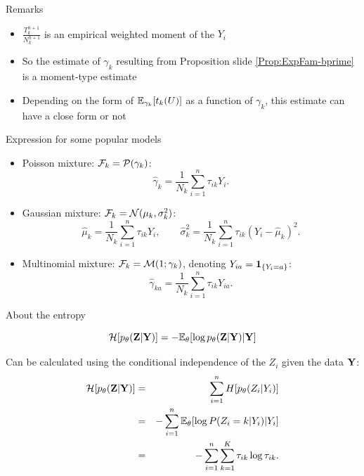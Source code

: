 \documentclass[compress,10pt]{beamer}
\begin{document}
\begin{frame}{Remarks}


\begin{itemize}
 \item $\frac{T^{h+1}_k}{N^{h+1}_k}$ is an empirical weighted moment of the $Y_i$ 
 \item So the estimate of $\gamma_k$ resulting from Proposition slide \ref{Prop:ExpFam-bprime} is a moment-type estimate
 \item Depending on the form of $\mathbb{E}_{\gamma_k}[t_k(U)]$ as a function of $\gamma_k$, this estimate can have a close form or not
 
\end{itemize}
\end{frame}


\begin{frame}{Expression for some popular models}
\begin{itemize}
 \item \textcolor{dgreen}{Poisson mixture}: $\mathcal{F}_k = \mathcal{P}(\gamma_k)$:
  $$
  \widehat{\gamma}_k = \frac{1}{N_k} \sum_{i=1}^n \tau_{ik} Y_i. 
  $$
 \item \textcolor{dgreen}{Gaussian mixture}: $\mathcal{F}_k = \mathcal{N}(\mu_k, \sigma^2_k)$:
  $$
  \widehat{\mu}_k = \frac{1}{N_k} \sum_{i=1}^n \tau_{ik} Y_i, 
  \qquad
  \widehat{\sigma}^2_k = \frac{1}{N_k} \sum_{i=1}^n \tau_{ik} (Y_i - \widehat{\mu}_k)^2.
  $$	
 \item \textcolor{dgreen}{Multinomial mixture}: $\mathcal{F}_k = \mathcal{M}(1; \gamma_k)$, denoting $Y_{ia} = \mathbf{1}_{\{Y_i = a\}}$:
  $$
  \widehat{\gamma}_{ka} = \frac{1}{N_k} \sum_{i=1}^n \tau_{ik} Y_{ia}. 
  $$	
\end{itemize}

\end{frame}

\begin{frame}{About the entropy}

$$\mathcal{H}[p_\theta(\mathbf{Z}|\mathbf{Y})]  = -\mathbb{E}_{\theta}[\log p_\theta(\mathbf{Z} | \mathbf{Y}) | \mathbf{Y}]$$ 

Can be calculated using the conditional independence of the $Z_i$ given the data $\mathbf{Y}$:
\begin{eqnarray} \label{Eq:MixtureEntropy}
  \mathcal{H}[p_\theta(\mathbf{Z}|\mathbf{Y})] & = & \sum_{i=1}^n H[p_\theta(Z_i|Y_i)] \nonumber \\
    & = & - \sum_{i=1}^n \mathbb{E}_\theta[\log P(Z_i = k|Y_i) | Y_i] \\
    & = & - \sum_{i=1}^n \sum_{k=1}^K \tau_{ik} \log \tau_{ik}. \nonumber 
\end{eqnarray}


\end{frame}
\end{document}

